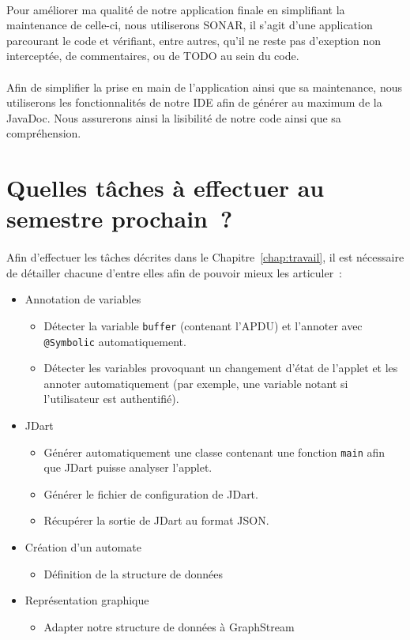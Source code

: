 \paragraph{}
Pour améliorer ma qualité de notre application finale en simplifiant la maintenance de celle-ci, nous utiliserons SONAR, il s'agit d'une application parcourant le code et vérifiant, entre autres, qu'il ne reste pas d'exeption non interceptée, de commentaires, ou de TODO au sein du code.

\paragraph{}
Afin de simplifier la prise en main de l'application ainsi que sa maintenance, nous utiliserons les fonctionnalités de notre IDE afin de générer au maximum de la JavaDoc. Nous assurerons ainsi la lisibilité de notre code ainsi que sa compréhension.

\section{Quelles tâches à effectuer au semestre prochain~?}

\paragraph{}
Afin d'effectuer les tâches décrites dans le Chapitre~\ref{chap:travail}, il est nécessaire de détailler chacune d'entre elles afin de pouvoir mieux les articuler~:

\begin{itemize}
\item Annotation de variables
  \begin{itemize}
  \item Détecter la variable \verb|buffer| (contenant l'\gls{APDU}) et l'annoter avec \verb|@Symbolic| automatiquement.
  \item Détecter les variables provoquant un changement d'état de l'applet et les annoter automatiquement (par exemple, une variable notant si l'utilisateur est authentifié).
  \end{itemize}
\item JDart
  \begin{itemize}
  \item Générer automatiquement une classe contenant une fonction \verb|main| afin que JDart puisse analyser l'applet.
  \item Générer le fichier de configuration de JDart.
  \item Récupérer la sortie de JDart au format JSON.
  \end{itemize}
\item Création d'un automate
  \begin{itemize}
  \item Définition de la structure de données
  \end{itemize} 
\item Représentation graphique
  \begin{itemize}
  \item Adapter notre structure de données à GraphStream
  \end{itemize}
\end{itemize}

